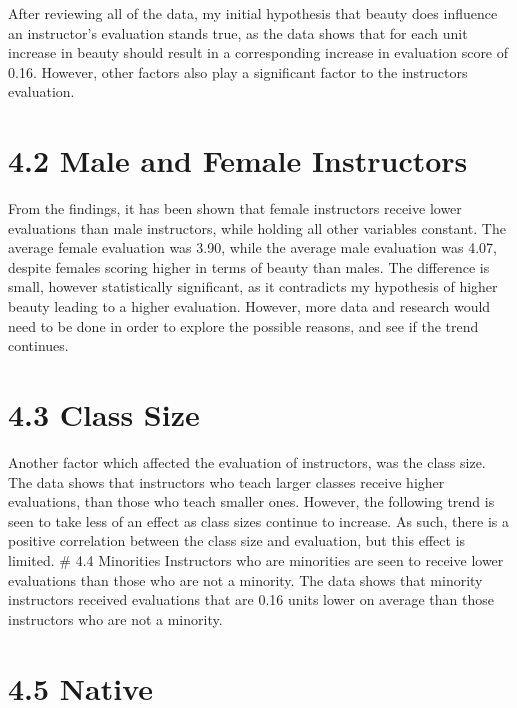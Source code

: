 \documentclass[
  letterpaper,
  DIV=11,
  numbers=noendperiod]{scrartcl}
\begin{document}
After reviewing all of the data, my initial hypothesis that beauty does
influence an instructor's evaluation stands true, as the data shows that
for each unit increase in beauty should result in a corresponding
increase in evaluation score of 0.16. However, other factors also play a
significant factor to the instructors evaluation.

\hypertarget{male-and-female-instructors}{%
\section{4.2 Male and Female
Instructors}\label{male-and-female-instructors}}

From the findings, it has been shown that female instructors receive
lower evaluations than male instructors, while holding all other
variables constant. The average female evaluation was 3.90, while the
average male evaluation was 4.07, despite females scoring higher in
terms of beauty than males. The difference is small, however
statistically significant, as it contradicts my hypothesis of higher
beauty leading to a higher evaluation. However, more data and research
would need to be done in order to explore the possible reasons, and see
if the trend continues.

\hypertarget{class-size}{%
\section{4.3 Class Size}\label{class-size}}

Another factor which affected the evaluation of instructors, was the
class size. The data shows that instructors who teach larger classes
receive higher evaluations, than those who teach smaller ones. However,
the following trend is seen to take less of an effect as class sizes
continue to increase. As such, there is a positive correlation between
the class size and evaluation, but this effect is limited. \# 4.4
Minorities Instructors who are minorities are seen to receive lower
evaluations than those who are not a minority. The data shows that
minority instructors received evaluations that are 0.16 units lower on
average than those instructors who are not a minority.

\hypertarget{native}{%
\section{4.5 Native}\label{native}}
\end{document}
